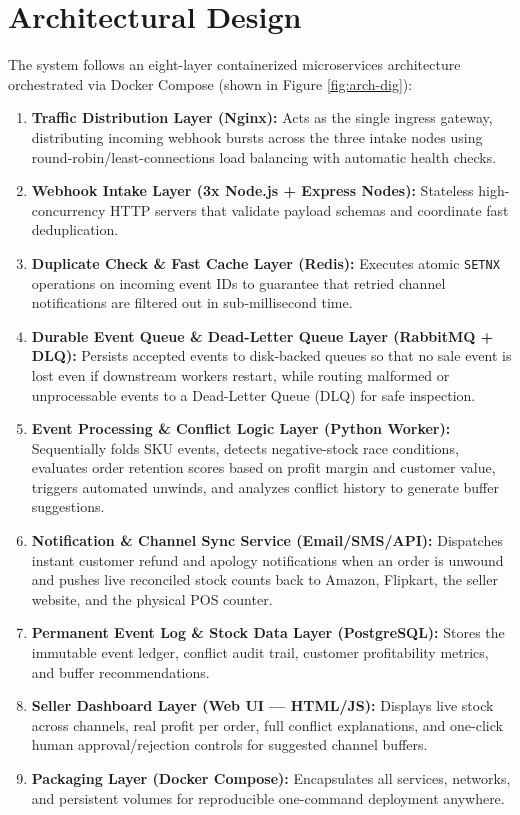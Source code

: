 \documentclass[oneside,a4paper,12pt]{report}
\begin{document}
\section{Architectural Design}
The system follows an eight-layer containerized microservices architecture orchestrated via Docker Compose (shown in Figure \ref{fig:arch-dig}):
\begin{enumerate}
  \item \textbf{Traffic Distribution Layer (Nginx):} Acts as the single ingress gateway, distributing incoming webhook bursts across the three intake nodes using round-robin/least-connections load balancing with automatic health checks.
  \item \textbf{Webhook Intake Layer (3x Node.js + Express Nodes):} Stateless high-concurrency HTTP servers that validate payload schemas and coordinate fast deduplication.
  \item \textbf{Duplicate Check \& Fast Cache Layer (Redis):} Executes atomic \texttt{SETNX} operations on incoming event IDs to guarantee that retried channel notifications are filtered out in sub-millisecond time.
  \item \textbf{Durable Event Queue \& Dead-Letter Queue Layer (RabbitMQ + DLQ):} Persists accepted events to disk-backed queues so that no sale event is lost even if downstream workers restart, while routing malformed or unprocessable events to a Dead-Letter Queue (DLQ) for safe inspection.
  \item \textbf{Event Processing \& Conflict Logic Layer (Python Worker):} Sequentially folds SKU events, detects negative-stock race conditions, evaluates order retention scores based on profit margin and customer value, triggers automated unwinds, and analyzes conflict history to generate buffer suggestions.
  \item \textbf{Notification \& Channel Sync Service (Email/SMS/API):} Dispatches instant customer refund and apology notifications when an order is unwound and pushes live reconciled stock counts back to Amazon, Flipkart, the seller website, and the physical POS counter.
  \item \textbf{Permanent Event Log \& Stock Data Layer (PostgreSQL):} Stores the immutable event ledger, conflict audit trail, customer profitability metrics, and buffer recommendations.
  \item \textbf{Seller Dashboard Layer (Web UI — HTML/JS):} Displays live stock across channels, real profit per order, full conflict explanations, and one-click human approval/rejection controls for suggested channel buffers.
  \item \textbf{Packaging Layer (Docker Compose):} Encapsulates all services, networks, and persistent volumes for reproducible one-command deployment anywhere.
\end{enumerate}
\end{document}

